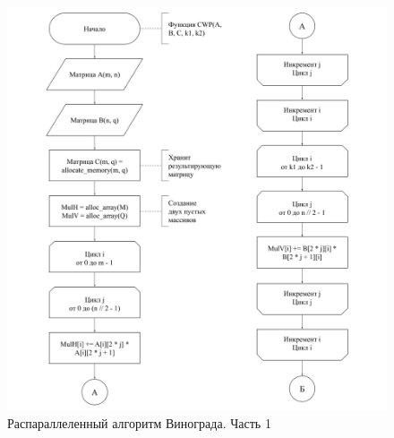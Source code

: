 \documentclass[../main.tex]{subfiles}
\begin{document}
	\begin{figure}[H]
		\centering
		\includegraphics[scale=0.5]{img/Winiger1}
		\caption[Распараллеленный алгоритм Винограда. Часть 1]{Распараллеленный алгоритм Винограда. Часть 1}
		\label{fig:winiger1}
	\end{figure}
\end{document}
